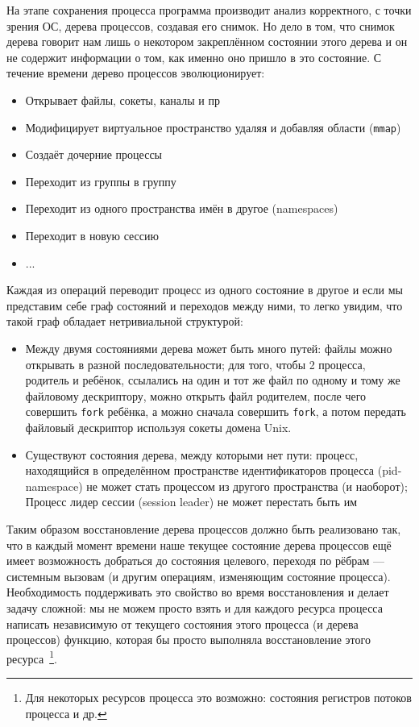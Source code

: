 На этапе сохранения процесса программа производит анализ корректного, с точки зрения ОС, дерева процессов, создавая его снимок. Но дело в том, что снимок дерева говорит нам лишь о некотором закреплённом состоянии этого дерева и он не содержит информации о том, как именно оно пришло в это состояние. С течение времени дерево процессов эволюционирует:

\begin{itemize}
	\item Открывает файлы, сокеты, каналы и пр
	\item Модифицирует виртуальное пространство удаляя и добавляя области (\texttt{mmap})
	\item Создаёт дочерние процессы
	\item Переходит из группы в группу
	\item Переходит из одного пространства имён в другое (namespaces)
	\item Переходит в новую сессию
	\item ...
\end{itemize}

Каждая из операций переводит процесс из одного состояние в другое и если мы представим себе граф состояний и переходов
между ними, то легко увидим, что такой граф обладает нетривиальной структурой:

\begin{itemize}
	\item Между двумя состояниями дерева может быть много путей: файлы можно открывать в разной последовательности; для того, чтобы 2 процесса, родитель и ребёнок, ссылались на один и тот же файл по одному и тому же файловому дескриптору, можно открыть файл родителем, после чего совершить \texttt{fork} ребёнка, а можно сначала совершить \texttt{fork}, а потом передать файловый дескриптор используя сокеты домена Unix.

	\item Существуют состояния дерева, между которыми нет пути: процесс, находящийся в определённом пространстве идентификаторов процесса (pid-namespace) не может стать процессом из другого пространства (и наоборот); Процесс лидер сессии (session leader) не может перестать быть им
\end{itemize}

Таким образом восстановление дерева процессов должно быть реализовано так, что в каждый момент времени наше текущее состояние дерева процессов ещё имеет возможность добраться до состояния целевого, переходя по рёбрам --- системным вызовам (и другим операциям, изменяющим состояние процесса). Необходимость поддерживать это свойство во время восстановления и делает задачу сложной: мы не можем просто взять и для каждого ресурса процесса написать независимую от текущего состояния этого процесса (и дерева процессов) функцию, которая бы просто выполняла восстановление этого ресурса~\footnote{Для некоторых ресурсов процесса это возможно: состояния регистров потоков процесса и др.}.

